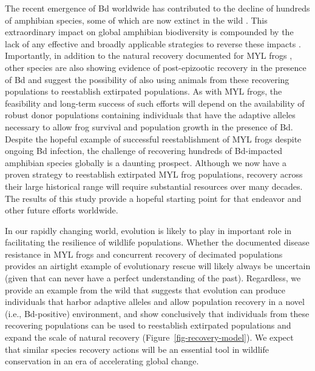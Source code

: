 \documentclass[9pt,twocolumn,twoside,lineno]{pnas-new}
\begin{document}
The recent emergence of Bd worldwide has contributed to the decline of
hundreds of amphibian species, some of which are now extinct in the wild
\citep{scheele2019}. This extraordinary impact on global amphibian
biodiversity is compounded by the lack of any effective and broadly
applicable strategies to reverse these impacts
\citep{garner2016, knapp2022}. Importantly, in addition to the natural
recovery documented for MYL frogs \citep{knapp2016}, other species are
also showing evidence of post-epizootic recovery in the presence of Bd
\citep{scheele2017, voyles2018} and suggest the possibility of also
using animals from these recovering populations to reestablish
extirpated populations. As with MYL frogs, the feasibility and long-term
success of such efforts will depend on the availability of robust donor
populations containing individuals that have the adaptive alleles
necessary to allow frog survival and population growth in the presence
of Bd. Despite the hopeful example of successful reestablishment of MYL
frogs despite ongoing Bd infection, the challenge of recovering hundreds
of Bd-impacted amphibian species globally is a daunting prospect.
Although we now have a proven strategy to reestablish extirpated MYL
frog populations, recovery across their large historical range will
require substantial resources over many decades. The results of this
study provide a hopeful starting point for that endeavor and other
future efforts worldwide.

In our rapidly changing world, evolution is likely to play in important
role in facilitating the resilience of wildlife populations. Whether the
documented disease resistance in MYL frogs and concurrent recovery of
decimated populations provides an airtight example of evolutionary
rescue will likely always be uncertain (given that can never have a
perfect understanding of the past). Regardless, we provide an example
from the wild that suggests that evolution can produce individuals that
harbor adaptive alleles and allow population recovery in a novel (i.e.,
Bd-positive) environment, and show conclusively that individuals from
these recovering populations can be used to reestablish extirpated
populations and expand the scale of natural recovery
(Figure~\ref{fig-recovery-model}). We expect that similar species
recovery actions will be an essential tool in wildlife conservation in
an era of accelerating global change.
\end{document}
